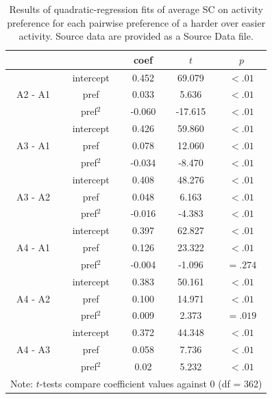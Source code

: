 \begin{subappendices}
\begin{table}[bh!]
    \centering
    \caption[short Appendix figure description]{Results of quadratic-regression fits of average SC on activity preference for each pairwise preference of a harder over easier activity. Source data are provided as a Source Data file.}
    \label{tab:S4}
    \begin{tabular}{ccccc}
    \hline
    \multicolumn{1}{l}{}     & \multicolumn{1}{l}{} & coef   & \textit{$t$} & \textit{$p$} \\ \hline
    \multirow{3}{*}{A2 - A1} & intercept            & 0.452  & 69.079       & $< .01$      \\
                             & pref                 & 0.033  & 5.636        & $< .01$      \\
                             & pref$^2$             & -0.060 & -17.615      & $< .01$      \\ \hline
    \multirow{3}{*}{A3 - A1} & intercept            & 0.426  & 59.860       & $< .01$      \\
                             & pref                 & 0.078  & 12.060       & $< .01$      \\
                             & pref$^2$             & -0.034 & -8.470       & $< .01$      \\ \hline
    \multirow{3}{*}{A3 - A2} & intercept            & 0.408  & 48.276       & $< .01$      \\
                             & pref                 & 0.048  & 6.163        & $< .01$      \\
                             & pref$^2$             & -0.016 & -4.383       & $< .01$      \\ \hline
    \multirow{3}{*}{A4 - A1} & intercept            & 0.397  & 62.827       & $< .01$      \\
                             & pref                 & 0.126  & 23.322       & $<.01$       \\
                             & pref$^2$             & -0.004 & -1.096       & $= .274$      \\ \hline
    \multirow{3}{*}{A4 - A2} & intercept            & 0.383  & 50.161       & $< .01$      \\
                             & pref                 & 0.100  & 14.971       & $< .01$      \\
                             & pref$^2$             & 0.009  & 2.373        & $= .019$      \\ \hline
    \multirow{3}{*}{A4 - A3} & intercept            & 0.372  & 44.348       & $< .01$      \\
                             & pref                 & 0.058  & 7.736        & $< .01$      \\
                             & pref$^2$             & 0.02   & 5.232        & $< .01$      \\ \hline
    \multicolumn{5}{l}{Note: $t$-tests compare coefficient values against 0 (df = 362)}     
    \end{tabular}
\end{table}



\end{subappendices}
